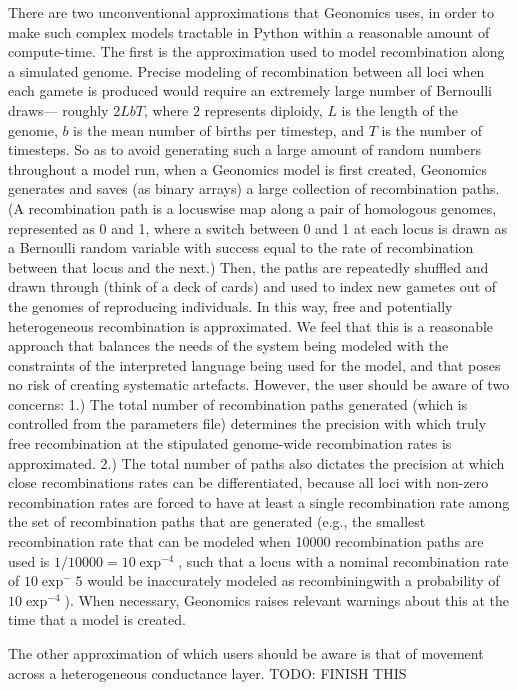 ﻿\documentclass{article}
\begin{document}
There are two unconventional approximations that Geonomics uses,
in order to make such complex models tractable in Python within a reasonable amount of compute-time.
The first is the approximation used to model recombination along a simulated genome.
Precise modeling of recombination between all loci when each gamete is produced
would require an extremely large number of Bernoulli draws---
roughly $2LbT$, where $2$ represents diploidy, $L$ is the length of the genome,
$b$ is the mean number of births per timestep, and $T$ is the number of timesteps.
So as to avoid generating such a large amount of random numbers throughout a model run,
when a Geonomics model is first created, Geonomics generates and saves
(as binary arrays) a large collection of recombination paths.
(A recombination path is a locuswise map along a pair of homologous genomes,
represented as 0 and 1, where a switch between 0 and 1 at each locus is drawn as a Bernoulli
random variable with success equal to the rate of recombination between that locus and the next.)
Then, the paths are repeatedly shuffled and drawn through (think of a deck of cards)
and used to index new gametes out of the genomes of reproducing individuals.
In this way, free and potentially heterogeneous recombination is approximated.
We feel that this is a reasonable approach that balances the needs of the system being modeled
with the constraints of the interpreted language being used for the model,
and that poses no risk of creating systematic artefacts.
However, the user should be aware of two concerns:
1.) The total number of recombination paths generated
(which is controlled from the parameters file) determines the precision with which truly 
free recombination at the stipulated genome-wide recombination rates is approximated.
2.) The total number of paths also dictates the precision at which close recombinations
rates can be differentiated, because all loci with non-zero recombination rates are forced to
have at least a single recombination rate among the set of recombination paths that are generated
(e.g., the smallest recombination rate that can be modeled when 10000 recombination paths
are used is $1/10000=10\exp^{-4}$, such that a locus with a nominal recombination rate of 
$10\exp^-5$ would be inaccurately modeled as recombiningwith a probability of $10\exp^{-4}$). 
When necessary, Geonomics raises relevant warnings about this at the time that a model is created.

The other approximation of which users should be aware
is that of movement across a heterogeneous conductance layer.
{\large TODO: FINISH THIS}
\end{document}
